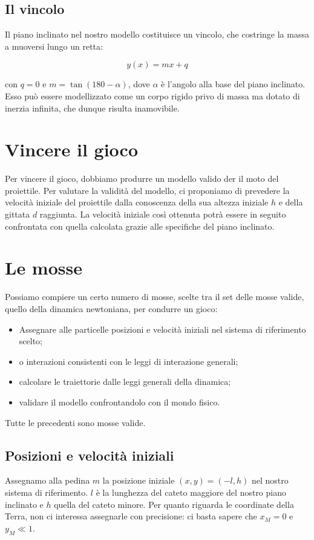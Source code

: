 \documentclass{article}
\begin{document}
\subsection{Il vincolo}
Il piano inclinato nel nostro modello costituisce un vincolo,
che costringe la massa a muoversi lungo un retta:

\begin{equation}
y(x) = m x + q
\end{equation}

con $q = 0$ e $m = \tan (180 -\alpha)$, dove $\alpha$ è l'angolo
alla base del piano inclinato.
Esso può essere modellizzato come un corpo rigido privo di massa
ma dotato di inerzia infinita, che dunque risulta inamovibile.

\section{Vincere il gioco}
Per vincere il gioco, dobbiamo produrre un modello valido
der il moto del proiettile. Per valutare la validità
del modello, ci proponiamo di prevedere la velocità iniziale
del proiettile dalla conoscenza della sua altezza iniziale
$h$ e della gittata $d$ raggiunta. La velocità iniziale
così ottenuta potrà essere in seguito confrontata con quella
calcolata grazie alle specifiche del piano inclinato.

\section{Le mosse}
Possiamo compiere un certo numero di mosse, scelte tra il set
delle mosse valide, quello della dinamica newtoniana, per
condurre un gioco:

\begin{itemize}
\item Assegnare alle particelle posizioni e velocità iniziali nel sistema di riferimento scelto;
\item o interazioni consistenti con le leggi di interazione generali;
\item calcolare le traiettorie dalle leggi generali della dinamica;
\item validare il modello confrontandolo con il mondo fisico.
\end{itemize}

Tutte le precedenti sono mosse valide.

\subsection{Posizioni e velocità iniziali}
Assegnamo alla pedina $m$ la posizione iniziale $(x,y) = (-l,h)$ nel nostro
sistema di riferimento.
$l$ è la lunghezza del cateto maggiore del nostro piano inclinato e $h$
quella del cateto minore.
Per quanto riguarda le coordinate della
Terra, non ci interessa assegnarle con precisione: ci basta sapere
che $x_M = 0$ e $y_M \ll 1$.
\end{document}
